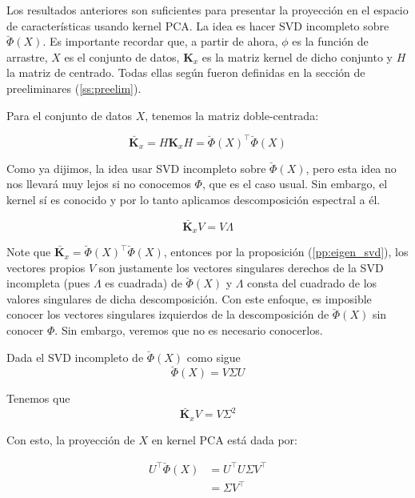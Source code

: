 \documentclass{article}
\numberwithin{equation}{section}
\theoremstyle{remark}
\theoremstyle{definition}
\theoremstyle{remark}
\theoremstyle{remark}
\begin{document}
Los resultados anteriores son suficientes para presentar la proyección en el espacio de 
características usando kernel PCA. La idea es hacer SVD incompleto sobre $\breve{\Phi}(X)$.
Es importante recordar que, a partir de ahora, $\phi$ es la función de arrastre, $X$ es el conjunto
de datos, $\bm{K}_x$ es la matriz kernel de dicho conjunto y $H$ la matriz de centrado. Todas ellas 
según fueron definidas en la sección de preeliminares (\ref{ss:preelim}).

Para el conjunto de datos $X$, tenemos la matriz doble-centrada:

\begin{equation}
    \breve{\bm{K}_x} = H \bm{K}_x H = \breve{\Phi}(X)^\intercal \breve{\Phi}(X)
\end{equation}

Como ya dijimos, la idea usar SVD incompleto sobre $\breve{\Phi}(X)$, pero esta idea no nos
llevará muy lejos si no conocemos $\Phi$, que es el caso usual. Sin embargo, el kernel sí es 
conocido y por lo tanto aplicamos descomposición espectral a él.

\begin{equation}
    \breve{\bm{K}_x} V = V \Lambda
\end{equation}

Note que $\breve{\bm{K}_x} = \breve{\Phi}(X)^\intercal \breve{\Phi}(X)$, entonces por la proposición 
(\ref{pp:eigen_svd}), los vectores propios $V$ son justamente los vectores singulares derechos de 
la SVD incompleta (pues $\Lambda$ es cuadrada) de $\breve{\Phi}(X)$ y $\Lambda$ consta del cuadrado de los valores singulares
de dicha descomposición. Con este enfoque, es imposible conocer los vectores singulares izquierdos de
la descomposición de $\breve{\Phi}(X)$ sin conocer $\Phi$. Sin embargo, veremos que no es necesario conocerlos.

Dada el SVD incompleto de $\breve{\Phi}(X)$ como sigue
\begin{equation}
    \breve{\Phi}(X) = V \Sigma U
\end{equation}

Tenemos que 
\begin{equation}
   \breve{\bm{K}_x} V = V \Sigma^2
\end{equation}

Con esto, la proyección de $X$ en kernel PCA está dada por:

\begin{align*}
    U^\intercal \breve{\Phi}(X) &= U^\intercal U \Sigma V^\intercal \\
        &= \Sigma V^\intercal
\end{align*}
\end{document}
